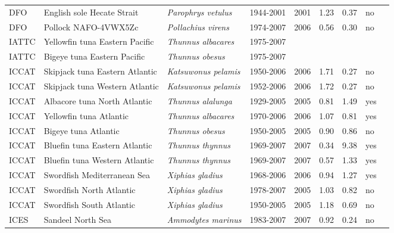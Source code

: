 \begin{longtable}{p{1.8cm}p{4cm}p{4cm}ccccp{1.9cm}c}
  DFO & English sole Hecate Strait & \textit{Parophrys vetulus} & 1944-2001 & 2001 & 1.23 & 0.37 & no & \cite{Flat99.pdf} \\ 
  DFO & Pollock NAFO-4VWX5Zc & \textit{Pollachius virens} & 1974-2007 & 2006 & 0.56 & 0.30 & no & \cite{NAFO-POLL4VWX5Zc-2006.pdf} \\ 
  IATTC & Yellowfin tuna Eastern Pacific & \textit{Thunnus albacares} & 1975-2007 &  &  &  &  & \cite{SAR8-YFT-ENG.pdf} \\ 
  IATTC & Bigeye tuna Eastern Pacific & \textit{Thunnus obesus} & 1975-2007 &  &  &  &  & \cite{JENSEN_BETEPAC_2008.pdf} \\ 
  ICCAT & Skipjack tuna Eastern Atlantic & \textit{Katsuwonus pelamis} & 1950-2006 & 2006 & 1.71 & 0.27 & no & \cite{JENSEN_YFINATL-2008.pdf} \\ 
  ICCAT & Skipjack tuna Western Atlantic & \textit{Katsuwonus pelamis} & 1952-2006 & 2006 & 1.72 & 0.27 & no & \cite{JENSEN_YFINATL-2008.pdf} \\ 
  ICCAT & Albacore tuna North Atlantic & \textit{Thunnus alalunga} & 1929-2005 & 2005 & 0.81 & 1.49 & yes & \cite{2007-ALB-STOCK-ASSESS-REP.pdf} \\ 
  ICCAT & Yellowfin tuna Atlantic & \textit{Thunnus albacares} & 1970-2006 & 2006 & 1.07 & 0.81 & yes & \cite{JENSEN-YFINATL-2008.pdf} \\ 
  ICCAT & Bigeye tuna Atlantic & \textit{Thunnus obesus} & 1950-2005 & 2005 & 0.90 & 0.86 & no & \cite{JENSEN-BIGEYEATL-2008.pdf} \\ 
  ICCAT & Bluefin tuna Eastern Atlantic & \textit{Thunnus thynnus} & 1969-2007 & 2007 & 0.34 & 9.38 & yes & \cite{2008-BFT-STOCK-ASSESS-REP.pdf} \\ 
  ICCAT & Bluefin tuna Western Atlantic & \textit{Thunnus thynnus} & 1969-2007 & 2007 & 0.57 & 1.33 & yes & \cite{2008-BFT-STOCK-ASSESS-REP.pdf} \\ 
  ICCAT & Swordfish Mediterranean Sea & \textit{Xiphias gladius} & 1968-2006 & 2006 & 0.94 & 1.27 & yes & \cite{ICCAT-Mediterranean-Xiphiasgladius-2007.pdf} \\ 
  ICCAT & Swordfish North Atlantic & \textit{Xiphias gladius} & 1978-2007 & 2005 & 1.03 & 0.82 & no & \cite{JENSEN_SWORDSATL-2007.pdf} \\ 
  ICCAT & Swordfish South Atlantic & \textit{Xiphias gladius} & 1950-2005 & 2005 & 1.18 & 0.69 & no & \cite{JENSEN_SWORDSATL-2007.pdf} \\ 
  ICES & Sandeel North Sea & \textit{Ammodytes marinus} & 1983-2007 & 2007 & 0.92 & 0.24 & no & \cite{ICES-WGNSSK-2007.pdf} \\ 

\end{longtable}
